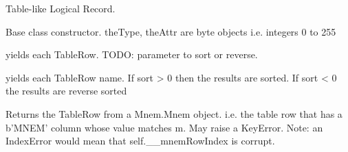 \documentclass[letterpaper,10pt,english]{sphinxmanual}
\begin{document}
\begin{fulllineitems}
\label{\detokenize{ref/LIS/core/LogiRec:TotalDepth.LIS.core.LogiRec.LrTable}}
Table-like Logical Record.

\begin{fulllineitems}
\label{\detokenize{ref/LIS/core/LogiRec:TotalDepth.LIS.core.LogiRec.LrTable.__init__}}
Base class constructor. theType, theAttr are byte objects i.e. integers 0 to 255

\end{fulllineitems}


\begin{fulllineitems}
\label{\detokenize{ref/LIS/core/LogiRec:TotalDepth.LIS.core.LogiRec.LrTable.genRows}}
yields each TableRow.
TODO: parameter to sort or reverse.

\end{fulllineitems}


\begin{fulllineitems}
\label{\detokenize{ref/LIS/core/LogiRec:TotalDepth.LIS.core.LogiRec.LrTable.genRowNames}}
yields each TableRow name.
If sort \textgreater{} 0 then the results are sorted. If sort \textless{} 0 the results are reverse sorted

\end{fulllineitems}


\begin{fulllineitems}
\label{\detokenize{ref/LIS/core/LogiRec:TotalDepth.LIS.core.LogiRec.LrTable.retRowByMnem}}
Returns the TableRow from a Mnem.Mnem object. i.e. the table row that has a b’MNEM’
column whose value matches m.
May raise a KeyError. Note: an IndexError would mean that self.\_\_mnemRowIndex is corrupt.


\end{fulllineitems}
\end{fulllineitems}
\end{document}
